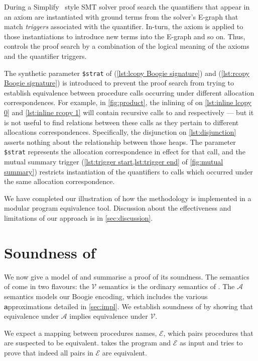 \documentclass[runningheads,a4paper]{llncs}
\newcommand*{\equivmap}{\mathcal{E}}
\newcommand*\Asemantics{\mathcal{A}}
\newcommand*\asemantics{$\Asemantics$ semantics}
\newcommand*\Vsemantics{\mathcal{V}}
\newcommand*\vsemantics{$\Vsemantics$ semantics}
\begin{document}
During a Simplify~\cite{Detlefs2005} style SMT solver proof search the quantifiers that appear in an axiom are instantiated with ground terms from the solver's E-graph that match \emph{triggers} associated with the quantifier. In-turn, the axiom is applied to those instantiations to introduce new terms into the E-graph and so on. Thus, \tool{} controls the proof search by a combination of the logical meaning of the axioms and the quantifier triggers.

The synthetic parameter \texttt{\$strat} of \copylr{} (\cref{lst:lcopy Boogie signature}) and \copyrl{} (\cref{lst:rcopy Boogie signature})  is introduced to prevent the proof search from trying to establish equivalence between procedure calls occurring under different allocation correspondences. For example, in \cref{fig:product}, the inlining of \copylr{} on \cref{lst:inline lcopy 0} and \cref{lst:inline rcopy 1} will contain recursive calls to \copylr{} and \copyrl{} respectively --- but it is not useful to find relations between these calls as they pertain to different allocations correspondences. Specifically, the disjunction on \cref{lst:disjunction} asserts nothing about the relationship between those heaps. The parameter \texttt{\$strat} represents the allocation correspondence in effect for that call, and the mutual summary trigger (\cref{lst:trigger start,lst:trigger end} of \cref{fig:mutual summary}) restricts instantiation of the quantifiers to calls which occurred under the same allocation correspondence.

We have completed our illustration of how the \metho{} methodology is implemented in a modular program equivalence tool. Discussion about the effectiveness and limitations of our approach is in \cref{sec:discussion}. 

\section{Soundness of \metho{}}\label{sec:soundness}

We now give a model of \metho{} and summarise a proof of its soundness. The semantics of \lang{} come in two flavours: the \vsemantics{} is the ordinary semantics of \lang{}. The \asemantics{} models our Boogie encoding, which includes the various \textbf{a}pproximations detailed in \cref{sec:impl}. We establish soundness of \metho{} by showing that equivalence under $\Asemantics$ implies equivalence under $\Vsemantics$.

We expect a mapping between procedures names, $\equivmap$, which pairs procedures that are suspected to be equivalent. \metho{} takes the program and $\equivmap$ as input and tries to prove that indeed all pairs in $\equivmap$ are equivalent.
\end{document}
